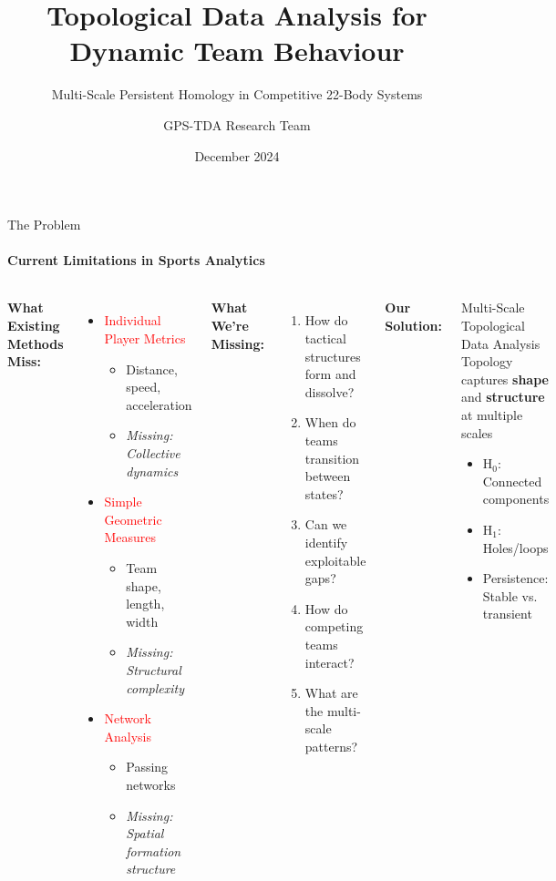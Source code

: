 \documentclass[aspectratio=169]{beamer}
\title[Football-TDA]{Topological Data Analysis for Dynamic Team Behaviour}
\subtitle{Multi-Scale Persistent Homology in Competitive 22-Body Systems}
\author{GPS-TDA Research Team}
\institute{Mathematical Foundations for Sports Analytics}
\date{December 2024}
\begin{document}
\begin{frame}
\titlepage
\end{frame}

\begin{frame}{The Problem}
\framesubtitle{Current Limitations in Sports Analytics}

\begin{columns}[T]
\textbf{What Existing Methods Miss:}
\begin{itemize}
    \item[\faTimes] \textcolor{red}{Individual Player Metrics}
    \begin{itemize}
        \item Distance, speed, acceleration
        \item \textit{Missing: Collective dynamics}
    \end{itemize}
    \item[\faTimes] \textcolor{red}{Simple Geometric Measures}
    \begin{itemize}
        \item Team shape, length, width
        \item \textit{Missing: Structural complexity}
    \end{itemize}
    \item[\faTimes] \textcolor{red}{Network Analysis}
    \begin{itemize}
        \item Passing networks
        \item \textit{Missing: Spatial formation structure}
    \end{itemize}
\end{itemize}

\textbf{What We're Missing:}
\begin{enumerate}
    \item How do tactical structures form and dissolve?
    \item When do teams transition between states?
    \item Can we identify exploitable gaps?
    \item How do competing teams interact?
    \item What are the multi-scale patterns?
\end{enumerate}

\vspace{0.5cm}
\textbf{Our Solution:}
\begin{block}{Multi-Scale Topological Data Analysis}
Topology captures \textbf{shape} and \textbf{structure} at multiple scales
\begin{itemize}
    \item H$_0$: Connected components
    \item H$_1$: Holes/loops
    \item Persistence: Stable vs. transient
\end{itemize}
\end{block}
\end{columns}
\end{frame}
\end{document}
